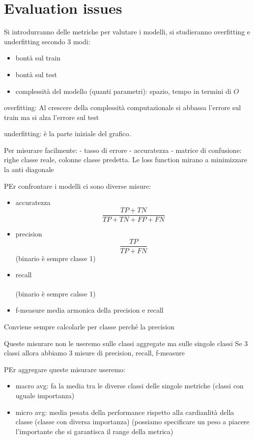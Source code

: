 \chapter{Evaluation issues}
Si introdurranno delle metriche per valutare i modelli, si studieranno overfitting e 
underfitting secondo 3 modi:
\begin{itemize}
    \item bontà sul train
    \item bontà sul test
    \item complessità del modello (quanti parametri): spazio, tempo in termini di $O$
\end{itemize}

overfitting:
Al crescere della complessità computazionale si abbassa l'errore sul train ma si
alza l'errore sul test 

underfitting: 
è la parte iniziale del grafico.

Per misurare facilmente:
- tasso di errore
- accuratezza
- matrice di confusione: righe classe reale, colonne classe predetta. Le loss function
mirano a minimizzare la anti diagonale


PEr confrontare i modelli ci sono diverse misure:
\begin{itemize}
    \item accuratezza$$\frac{TP+TN}{TP+TN+FP+FN}$$
    \item precision $$\frac{TP}{TP+FN}$$ (binario è sempre classe 1)
    \item recall$$\frac{}{}$$ (binario è sempre calsse 1)
    \item f-measure media armonica della precision e recall
\end{itemize}
Conviene sempre calcolarle per classe perché la precision 

Queste misurare non le useremo sulle classi aggregate ma sulle singole classi
Se 3 classi allora abbiamo 3 misure di precision, recall, f-measure


PEr aggregare queste misurare useremo:
\begin{itemize}
    \item macro avg: fa la media tra le diverse classi delle singole metriche 
    (classi con uguale importanza)
    \item micro avg: media pesata della performance rispetto alla cardianlità 
    della classe (classe con diversa importanza) (possiamo specificare un peso 
    a piacere l'importante che si garantisca il range della metrica)
\end{itemize}


